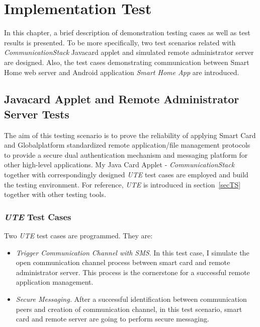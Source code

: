\chapter{Implementation Test} \label{secImpl}
In this chapter, a brief description of demonstration testing cases as well as test results is presented. To be more specifically, two test scenarios related with \emph{CommunicationStack} Javacard applet and simulated remote administrator server are designed. Also, the test cases demonstrating communication between Smart Home web server and Android application \emph{Smart Home App} are introduced.

\section{Javacard Applet and Remote Administrator Server Tests}
The aim of this testing scenario is to prove the reliability of applying Smart Card and Globalplatform standardized remote application/file management protocols to provide a secure dual authentication mechanism and messaging platform for other high-level applications. My Java Card Applet - \emph{CommunicationStack} together with correspondingly designed \emph{UTE} test cases are employed and build the testing environment. For reference, \emph{UTE} is introduced in section~\ref{secTS} together with other testing tools.

\subsection{\emph{UTE} Test Cases}

Two \emph{UTE} test cases are programmed. They are:
\begin{itemize}
\item \emph{Trigger Communication Channel with SMS}. In this test case, I simulate the open communication channel process between smart card and remote administrator server. This process is the cornerstone for a successful remote application management.
\item \emph{Secure Messaging.} After a successful identification between communication peers and creation of communication channel, in this test scenario, smart card and remote server are going to perform secure messaging. 
\end{itemize}

